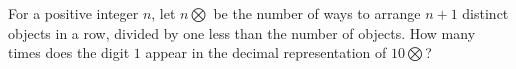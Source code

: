 For a positive integer $n$, let $n\bigotimes$ be the number of ways to arrange $n+1$ distinct objects in a row, divided by one less than the number of objects. How many times does the digit $1$ appear in the decimal representation of $10\bigotimes$?
